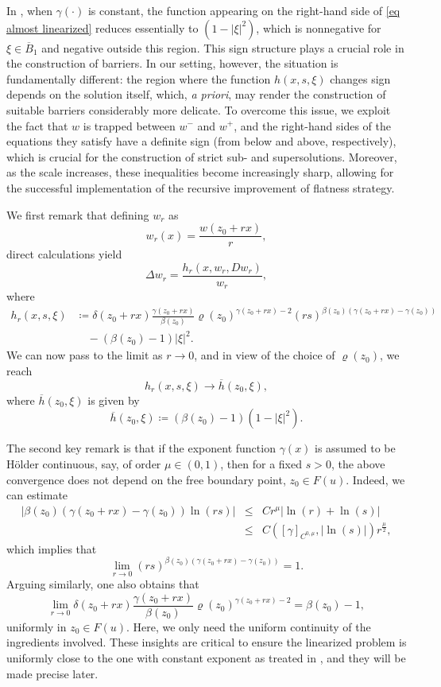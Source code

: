 \documentclass[reqno,11pt]{amsart}
\newcommand{\1}{\mathds{1}}
\numberwithin{equation}{section}
\begin{document}
In \cite{DSS}, when $\gamma(\cdot)$ is constant, the function appearing on the right-hand side of \eqref{eq almost linearized} reduces essentially to $(1-|\xi|^2)$, which is nonnegative for $\xi \in \overline{B}_1$ and negative outside this region. This sign structure plays a crucial role in the construction of barriers. In our setting, however, the situation is fundamentally different: the region where the function $h(x,s,\xi)$ changes sign depends on the solution itself, which, \textit{a priori}, may render the construction of suitable barriers considerably more delicate. To overcome this issue, we exploit the fact that $w$ is trapped between $w^-$ and $w^+$, and the right-hand sides of the equations they satisfy have a definite sign (from below and above, respectively), which is crucial for the construction of strict sub- and supersolutions. Moreover, as the scale increases, these inequalities become increasingly sharp, allowing for the successful implementation of the recursive improvement of flatness strategy.

We first remark that defining $w_r$ as
\begin{equation}\label{lip rescaling of linearized eq}
    w_r(x) = \frac{w(z_0 + rx)}{r},
\end{equation}
direct calculations yield 
\begin{equation}\label{scaled equation}
    \Delta w_r = \frac{h_r(x,w_r,Dw_r)}{w_r},
\end{equation}
where
\begin{align*}
    h_r(x,s,\xi) & \coloneqq \delta(z_0 + rx)\frac{\gamma(z_0 + rx)}{\beta(z_0)}\varrho(z_0)^{\gamma(z_0 + rx) - 2} (rs)^{\beta(z_0)(\gamma(z_0 + rx) - \gamma(z_0))} \\
    & \quad - (\beta(z_0)-1)|\xi|^2. 
\end{align*}
We can now pass to the limit as $r \rightarrow 0$, and in view of the choice of $\varrho(z_0)$, we reach
$$
    h_r(x,s,\xi) \rightarrow  \overline{h}(z_0,\xi),
$$
where $\overline{h}(z_0,\xi)$ is given by
$$
    \overline{h}(z_0,\xi) \coloneqq (\beta(z_0)-1)(1-|\xi|^2).
$$

The second key remark is that if the exponent function $\gamma(x)$ is assumed to be H\"older continuous, say,  of order $\mu \in (0,1)$, then for a fixed $s>0$, the above convergence does not depend on the free boundary point, $z_0 \in F(u)$. Indeed, we can estimate
\begin{eqnarray*} 
|\beta(z_0)(\gamma(z_0 + rx) - \gamma(z_0))\ln(rs)|  & \leq  &\displaystyle  Cr^\mu|\ln(r) + \ln(s)|\\
     & \leq &  C([\gamma]_{C^{0,\mu}},|\ln(s)|) r^{\frac{\mu}{2}},
\end{eqnarray*}
which implies that
$$
    \lim_{r \rightarrow 0} (rs)^{\beta(z_0)(\gamma(z_0 + rx) - \gamma(z_0))} = 1.
$$
Arguing similarly, one also obtains that
$$
    \lim_{r \rightarrow 0} \delta(z_0 + rx)\frac{\gamma(z_0 + rx)}{\beta(z_0)}\varrho(z_0)^{\gamma(z_0 + rx) - 2} = \beta(z_0) - 1,
$$
uniformly in $z_0 \in F(u)$. Here, we only need the uniform continuity of the ingredients involved. These insights are critical to ensure the linearized problem is uniformly close to the one with constant exponent as treated in \cite{DSS} , and they will be made precise later.
\end{document}
